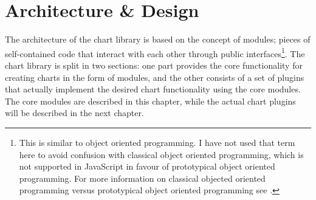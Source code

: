 \chapter{Architecture \& Design}
The architecture of the chart library is based on the concept of modules; pieces of self-contained code that interact with each other through public interfaces\footnote{This is similar to object oriented programming. I have not used that term here to avoid confusion with classical object oriented programming, which is not supported in JavaScript in favour of prototypical object oriented programming. For more information on classical objected oriented programming versus prototypical object oriented programming see \cite{crockford08}.}. The chart library is split in two sections: one part provides the core functionality for creating charts in the form of modules, and the other consists of a set of plugins that actually implement the desired chart functionality using the core modules. The core modules are described in this chapter, while the actual chart plugins will be described in the next chapter.










